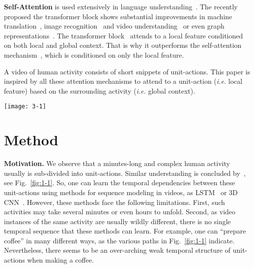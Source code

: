 \documentclass[10pt,twocolumn,letterpaper]{article}
\def\ie{\emph{i.e.}\xspace}
\newcommand{\partitle}[1]{\noindent\textbf{#1}}
\newcommand{\ptspace}{\vspace*{5pt}}
\begin{document}
\ptspace
\partitle{Self-Attention}
is used extensively in language understanding~\cite{lin2017structured}.
The recently proposed the transformer block shows substantial improvements in machine translation~\cite{vaswani2017attention}, image recognition~\cite{wang2017non} and video understanding~\cite{girdhar2018video, wu2018long} or even graph representations~\cite{velivckovic2017graph}.
The transformer block~\cite{wu2018long} attends to a local feature conditioned on both local and global context.
That is why it outperforms the self-attention mechanism~\cite{li2018videolstm, du2018interaction, yang2018action}, which is conditioned on only the local feature.

A video of human activity consists of short snippets of unit-actions.
This paper is inspired by all these attention mechanisms to attend to a unit-action (\ie local feature) based on the surrounding activity (\ie global context).

\begin{figure*}[!ht]
\begin{center}
\texttt{[image: 3-1]}
\end{center}
\caption{
Overview of VideoGraph.
It takes as input a video segment $s_i$ of 8 frames from an activity video $v$. Then, it represents it using standard 3D CNN, \textit{.e.g} I3D.
The corresponding feature representation is $x_i$.
Then, a node attention block attends to a set of $N$ latent concepts based on their similarities with $x_i$, which results in the node-attenative representation $Z_i$.
A novel graph embedding layer then processes $Z_i$ to learn the relationships between its latent concepts, and arrives at the final video-level representation.
Finally, an MLP is used for classification.}
\label{fig:3-1}
\vspace*{-5mm}
\end{figure*}

\section{Method}\label{sec:method}
\partitle{Motivation.}
We observe that a minutes-long and complex human activity usually is sub-divided into unit-actions. Similar understanding is concluded by~\cite{kuehne2014language, hussein2018timeception}, see Fig.~\ref{fig:1-1}.
So, one can learn the temporal dependencies between these unit-actions using methods for sequence modeling in videos, as LSTM~\cite{li2017concurrent} or 3D CNN~\cite{xie2017rethinking}.
However, these methods face the following limitations.
First, such activities may take several minutes or even hours to unfold.
Second, as video instances of the same activity are usually wildly different, there is no single temporal sequence that these methods can learn.
For example, one can ``prepare coffee'' in many different ways, as the various paths in Fig.~\ref{fig:1-1} indicate.
Nevertheless, there seems to be an over-arching weak temporal structure of unit-actions when making a coffee.
\end{document}
